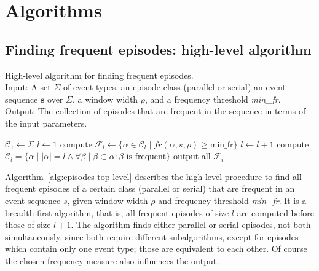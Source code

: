 \chapter{Algorithms}

\section{Finding frequent episodes: high-level algorithm}

\begin{algorithm}

\caption{High-level algorithm for finding frequent episodes. \\
Input: A set $ \Sigma $ of event types, an episode class (parallel or serial) an event sequence $ \boldsymbol{s} $ over $ \Sigma $, a window width $ \rho $, and a frequency threshold \emph{min\_fr}. \\
Output: The collection of episodes that are frequent in the sequence in terms of the input parameters.
}

\begin{algorithmic}[1]

\State $ \mathcal{C}_1 \gets \Sigma $
\State $ l \gets 1 $
    \State compute $ \mathcal{F}_l \gets \{ \alpha \in \mathcal{C}_l \mid fr(\alpha, s, \rho) \geq \text{min\_fr} \} $
    \State $ l \gets l + 1 $
    \State compute $ \mathcal{C}_l = \{ \alpha \mid | \alpha | = l \wedge \forall \beta \mid \beta \subset \alpha : \beta \text{ is frequent} \} $
\EndWhile
\State output all $ \mathcal{F}_i $

\end{algorithmic}

\label{alg:episodes-top-level}
\end{algorithm}


Algorithm~\ref{alg:episodes-top-level} describes the high-level procedure to find all frequent episodes of a certain class (parallel or serial) that are frequent in an event sequence $ s $, given window width $ \rho $ and frequency threshold \emph{min\_fr}. It is a breadth-first algorithm, that is, all frequent episodes of size $ l $ are computed before those of size $ l + 1 $. The algorithm finds either parallel or serial episodes, not both simultaneously, since both require different subalgorithms, except for episodes which contain only one event type; those are equivalent to each other. Of course the chosen frequency measure also influences the output.


